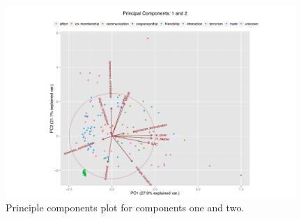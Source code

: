 \documentclass[3p,times]{elsarticle}
\begin{document}
\begin{figure}
\begin{center}
	\caption{\label{fig:1 and 2} Principle components plot for components one and two.}
		\includegraphics[width = 0.98\textwidth]{./images/Observed_PCA_Components1_2.pdf}
\end{center}
\end{figure}



%
%
\end{document}
